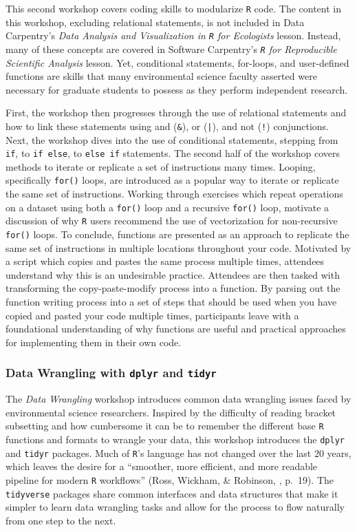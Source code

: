\documentclass[12pt]{article}
\begin{document}
\quad This second workshop covers coding skills to modularize \texttt{R} code. 
The content in this workshop, excluding relational statements, is not
included in Data Carpentry's \emph{Data Analysis and Visualization in \texttt{R}
for Ecologists} lesson. Instead, many of these concepts are covered in Software
Carpentry's \emph{\texttt{R} for Reproducible Scientific Analysis} lesson. Yet,
conditional statements, for-loops, and user-defined functions are skills that
many environmental science faculty asserted were necessary for graduate students
to possess as they perform independent research. 

\quad First, the workshop then progresses through the use of relational
statements and how to link these statements using and (\texttt{\&}), or
(\texttt{|}), and not (\texttt{!}) conjunctions. Next, the workshop dives into
the use of conditional statements, stepping from \texttt{if}, to \texttt{if
else}, to \texttt{else if} statements. The second half of the workshop covers
methods to iterate or replicate a set of instructions many times. Looping,
specifically \texttt{for()} loops, are introduced as a popular way to iterate or
replicate the same set of instructions. Working through exercises which
repeat operations on a dataset using both a \texttt{for()} loop and a recursive 
\texttt{for()} loop, motivate a discussion of why \texttt{R} users recommend the
use of vectorization for non-recursive \texttt{for()} loops. To conclude,
functions are presented as an approach to replicate the same set of instructions
in multiple locations throughout your code. Motivated by a script which copies 
and pastes the same process multiple times, attendees understand why this is 
an undesirable practice. Attendees are then tasked with transforming the
copy-paste-modify process into a function. By parsing out the function writing
process into a set of steps that should be used when you have copied and pasted
your code multiple times, participants leave with a foundational understanding
of why functions are useful and practical approaches for implementing them in
their own code.

\subsubsection{Data Wrangling with \texttt{dplyr} and \texttt{tidyr}}
\label{sec:wrangle}

\quad The \emph{Data Wrangling} workshop introduces common data wrangling issues
faced by environmental science researchers. Inspired by the difficulty of
reading bracket subsetting and how cumbersome it can be to remember the
different base \texttt{R} functions and formats to wrangle your data, this
workshop introduces the \texttt{dplyr} \citep{dplyr} and \texttt{tidyr} 
\citep{tidyr} packages. Much of \texttt{R}'s language has not changed over the
last 20 years, which leaves the desire for a ``smoother, more efficient, and
more readable pipeline for modern \texttt{R} workflows'' (Ross, Wickham, 
\& Robinson, \citeyear{tidytools}, p.\ 19). The \texttt{tidyverse} packages
share common interfaces and data structures that make it simpler to learn data
wrangling tasks and allow for the process to flow naturally from one step to the
next. 
\end{document}
